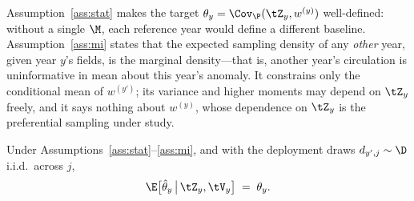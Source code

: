 


\noindent
Assumption~\ref{ass:stat} makes the target $\theta_y = \Cov_\P(\tZ_y, w^{(y)})$
well-defined: without a single $\M$, each reference year would define a different
baseline. Assumption~\ref{ass:mi} states that the expected sampling density of
any \emph{other} year, given year $y$'s fields, is the marginal density---that is,
another year's circulation is uninformative in mean about this year's anomaly. It
constrains only the conditional mean of $w^{(y')}$; its variance and higher
moments may depend on $\tZ_y$ freely, and it says nothing about $w^{(y)}$, whose
dependence on $\tZ_y$ is the preferential sampling under study.


\begin{proposition}
\label{prop:unbiased}
Under Assumptions~\ref{ass:stat}--\ref{ass:mi}, and with the deployment draws
$d_{y',j} \sim \D$ i.i.d.\ across $j$,
\begin{equation}
  \E\big[\hat\theta_y \,\big|\, \tZ_y, \tV_y\big] \;=\; \theta_y .
\end{equation}
\end{proposition}

